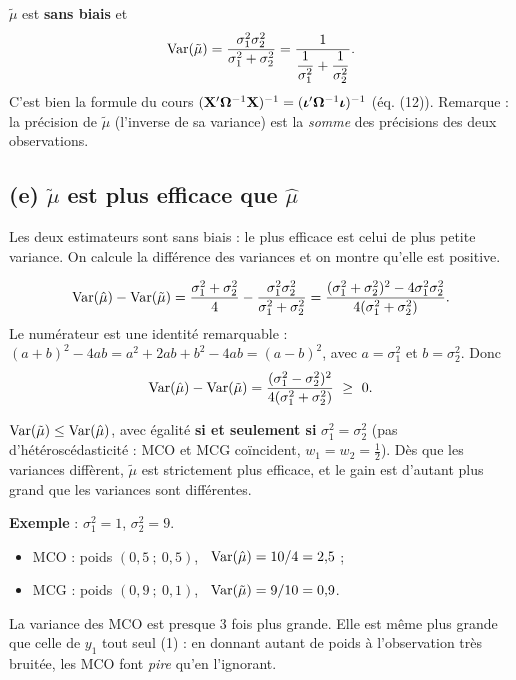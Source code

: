 \documentclass[11pt,a4paper]{article}
\begin{document}
\begin{reponse}
$\tilde\mu$ est \textbf{sans biais} et
\[
\operatorname{Var}(\tilde\mu)=\frac{\sigma_1^2\sigma_2^2}{\sigma_1^2+\sigma_2^2}=\frac{1}{\dfrac1{\sigma_1^2}+\dfrac1{\sigma_2^2}} .
\]
C'est bien la formule du cours $(\mathbf{X}'\bm{\Omega}^{-1}\mathbf{X})^{-1}=(\bm{\iota}'\bm{\Omega}^{-1}\bm{\iota})^{-1}$ (éq. (12)). Remarque : la précision de $\tilde\mu$ (l'inverse de sa variance) est la \emph{somme} des précisions des deux observations.
\end{reponse}

\subsection*{(e) $\tilde\mu$ est plus efficace que $\hat\mu$}

\begin{idee}
Les deux estimateurs sont sans biais : le plus efficace est celui de plus petite variance. On calcule la différence des variances et on montre qu'elle est positive.
\end{idee}

\[
\operatorname{Var}(\hat\mu)-\operatorname{Var}(\tilde\mu)=\frac{\sigma_1^2+\sigma_2^2}{4}-\frac{\sigma_1^2\sigma_2^2}{\sigma_1^2+\sigma_2^2}
=\frac{(\sigma_1^2+\sigma_2^2)^2-4\sigma_1^2\sigma_2^2}{4(\sigma_1^2+\sigma_2^2)} .
\]
Le numérateur est une identité remarquable : $(a+b)^2-4ab=a^2+2ab+b^2-4ab=(a-b)^2$, avec $a=\sigma_1^2$ et $b=\sigma_2^2$. Donc
\[
\Var(\hat\mu)-\Var(\tilde\mu)=\frac{(\sigma_1^2-\sigma_2^2)^2}{4(\sigma_1^2+\sigma_2^2)}\ \ge\ 0 .
\]

\begin{reponse}
$\operatorname{Var}(\tilde\mu)\le\operatorname{Var}(\hat\mu)$, avec égalité \textbf{si et seulement si} $\sigma_1^2=\sigma_2^2$ (pas d'hétéroscédasticité : MCO et MCG coïncident, $w_1=w_2=\frac12$). Dès que les variances diffèrent, $\tilde\mu$ est strictement plus efficace, et le gain est d'autant plus grand que les variances sont différentes.

\textbf{Exemple} : $\sigma_1^2=1$, $\sigma_2^2=9$.
\begin{itemize}[nosep]
\item MCO : poids $(0{,}5\ ;\ 0{,}5)$, \ $\operatorname{Var}(\hat\mu)=10/4=2{,}5$ ;
\item MCG : poids $(0{,}9\ ;\ 0{,}1)$, \ $\operatorname{Var}(\tilde\mu)=9/10=0{,}9$.
\end{itemize}
La variance des MCO est presque 3 fois plus grande. Elle est même plus grande que celle de $y_1$ tout seul (1) : en donnant autant de poids à l'observation très bruitée, les MCO font \emph{pire} qu'en l'ignorant.
\end{reponse}
\end{document}
